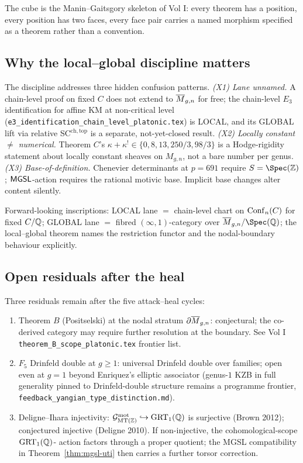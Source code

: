 The cube is the Manin--Gaitsgory skeleton of Vol I: every theorem has
a position, every position has two faces, every face pair carries a
named morphism specified as a theorem rather than a convention.

\subsection*{Why the local--global discipline matters}

The discipline addresses three hidden confusion patterns.
\emph{(X1) Lane unnamed.} A chain-level proof on fixed $C$ does not
extend to $\overline{M}_{g,n}$ for free; the chain-level $E_3$ identification
for affine KM at non-critical level
(\texttt{e3\_identification\_chain\_level\_platonic.tex}) is LOCAL, and
its GLOBAL lift via relative SC$^{\mathrm{ch,top}}$ is a separate,
not-yet-closed result.
\emph{(X2) Locally constant $\neq$ numerical.} Theorem $C$'s
$\kappa + \kappa^! \in \{0, 8, 13, 250/3, 98/3\}$ is a Hodge-rigidity
statement about locally constant sheaves on $M_{g,n}$, not a bare
number per genus.
\emph{(X3) Base-of-definition.} Chenevier determinants at $p = 691$
require $S = \Spec(\ZZ)$; $\mathsf{MGSL}$-action requires the rational motivic
base. Implicit base changes alter content silently.

Forward-looking inscriptions: LOCAL lane $=$ chain-level chart on
$\mathrm{Conf}_n(C)$ for fixed $C/\mathbb{Q}$; GLOBAL lane $=$ fibred
$(\infty,1)$-category over $\Moduli_{g,n}/\Spec(\QQ)$; the
local--global theorem names the restriction functor and the
nodal-boundary behaviour explicitly.

\subsection*{Open residuals after the heal}

Three residuals remain after the five attack--heal cycles:

\begin{enumerate}
\item Theorem $B$ (Positselski) at the nodal stratum
$\partial\overline{M}_{g,n}$: conjectural; the co-derived category may
require further resolution at the boundary. See Vol I
\texttt{theorem\_B\_scope\_platonic.tex} frontier list.
\item $F_5$ Drinfeld double at $g \ge 1$: universal Drinfeld
double over families; open even at $g = 1$ beyond Enriquez's
elliptic associator (genus-$1$ KZB in full generality pinned to
Drinfeld-double structure remains a programme frontier,
\texttt{feedback\_yangian\_type\_distinction.md}).
\item Deligne--Ihara injectivity: $\mathcal{G}^{\mathrm{mot}}_{\mathrm{MT}(\mathbb{Z})} \hookrightarrow
\mathrm{GRT}_1(\mathbb{Q})$ is surjective (Brown 2012); conjectured injective
(Deligne 2010). If non-injective, the cohomological-scope $\mathrm{GRT}_1(\mathbb{Q})$-
action factors through a proper quotient; the MGSL compatibility in
Theorem~\ref{thm:mgsl-uti} then carries a further torsor correction.
\end{enumerate}

